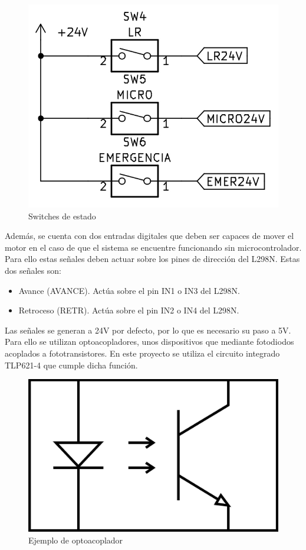 \begin{figure}[hbtp]
    \centering
    \includegraphics[scale=1.25]{03-placa/switches.png}
    \caption{Switches de estado}
    \label{fig:figura32switches}
    \end{figure}

Además, se cuenta con dos entradas digitales que deben ser capaces de mover el motor en el caso de que el
sistema se encuentre funcionando sin microcontrolador. Para ello estas señales deben actuar sobre los
pines de dirección del L298N. Estas dos señales son:
\begin{itemize}
    \item Avance (AVANCE). Actúa sobre el pin IN1 o IN3 del L298N.
    \item Retroceso (RETR). Actúa sobre el pin IN2 o IN4 del L298N.
\end{itemize}

Las señales se generan a 24V por defecto, por lo que es necesario su paso a 5V. Para ello se utilizan
optoacopladores, unos dispositivos que mediante fotodiodos acoplados a fototransistores. En este proyecto
se utiliza el circuito integrado TLP621-4 que cumple dicha función.

\begin{figure}[hbtp]
    \centering
    \includegraphics[width=\textwidth/4]{03-placa/02-optoac.png}
    \caption{Ejemplo de optoacoplador}
    \label{fig:figura33ejopto}
\end{figure}

